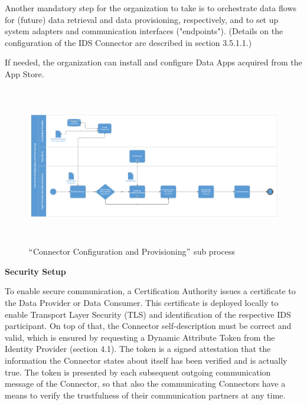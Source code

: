 Another mandatory step for the organization to take is to orchestrate data flows for (future) data retrieval and data provisioning, respectively, and to set up system adapters and communication interfaces ("endpoints"). (Details on the configuration of the IDS Connector are described in section 3.5.1.1.)

If needed, the organization can install and configure Data Apps acquired from the App Store.



\begin{figure}[H]
	\begin{Center}
		\includegraphics[width=6.53in,height=2.74in]{./media/image23.PNG}
		\caption{ $``$Connector Configuration and Provisioning$"$  sub process}
		\label{ fig:_Connector_Configuration_and_Provisioning_sub_process}
	\end{Center}
\end{figure}



\textbf{Security Setup}

To enable secure communication, a Certification Authority issues a certificate to the Data Provider or Data Consumer. This certificate is deployed locally to enable Transport Layer Security (TLS) and identification of the respective IDS participant. On top of that, the Connector self-description must be correct and valid, which is ensured by requesting a Dynamic Attribute Token from the Identity Provider (section 4.1). The token is a signed attestation that the information the Connector states about itself has been verified and is actually true. The token is presented by each subsequent outgoing communication message of the Connector, so that also the communicating Connectors have a means to verify the trustfulness of their communication partners at any time.

